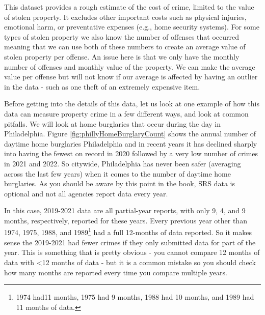 \documentclass[
]{krantz}
\begin{document}
This dataset provides a rough estimate of the cost of crime,
limited to the value of stolen property. It excludes other
important costs such as physical injuries, emotional harm,
or preventative expenses (e.g., home security systems). For
some types of stolen property we also know the number of
offenses that occurred meaning that we can use both of these
numbers to create an average value of stolen property per
offense. An issue here is that we only have the monthly
number of offenses and monthly value of the property. We can
make the average value per offense but will not know if our
average is affected by having an outlier in the data - such
as one theft of an extremely expensive item.

Before getting into the details of this data, let us look at
one example of how this data can measure property crime in a
few different ways, and look at common pitfalls. We will
look at home burglaries that occur during the day in
Philadelphia. Figure \ref{fig:phillyHomeBurglaryCount} shows
the annual number of daytime home burglaries Philadelphia
and in recent years it has declined sharply into having the
fewest on record in 2020 followed by a very low number of
crimes in 2021 and 2022. So citywide, Philadelphia has never
been safer (averaging across the last few years) when it
comes to the number of daytime home burglaries. As you
should be aware by this point in the book, SRS data is
optional and not all agencies report data every year.

In this case, 2019-2021 data are all partial-year reports,
with only 9, 4, and 9 months, respectively, reported for
these years. Every previous year other than 1974, 1975,
1988, and 1989\footnote{1974 had11 months, 1975 had 9
  months, 1988 had 10 months, and 1989 had 11 months of
  data.} had a full 12-months of data reported. So it makes
sense the 2019-2021 had fewer crimes if they only submitted
data for part of the year. This is something that is pretty
obvious - you cannot compare 12 months of data with
\textless12 months of data - but it is a common mistake so
you should check how many months are reported every time you
compare multiple years.
\end{document}
